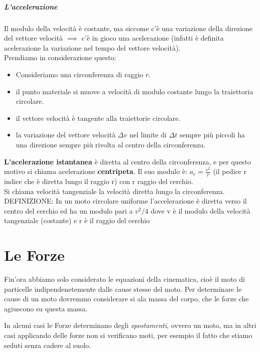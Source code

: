 \documentclass[12pt, a4paper, openany]{book}
\begin{document}
\paragraph*{L'accelerazione }Il modulo della velocità è costante, ma siccome c'è una variazione della direzione del vettore velocità $\implies$ c'è in gioco una acelerazione
(infatti è definita acelerazione la variazione nel tempo del vettore velocità).
\\Prendiamo in considerazione questo:
\begin{itemize}
    \item Consideriamo una circonferenza di raggio $r$.
    \item il punto materiale si muove a velocità di modulo costante lungo la traiettoria circolare.
    \item il vettore velocità è tangente alla traiettorie circolare.
    \item la variazione del vettore velocità $\Delta v$ nel limite di $\Delta t$ sempre più piccoli ha una direzione sempre più rivolta al centro della circonferenza.
\end{itemize}
\textbf{L'acelerazione istantanea} è diretta al centro della circonferenza, e per questo motivo si chiama acelerazione \textbf{centripeta}.
Il suo modulo è: $a_r = \frac{v^2}{r}$ (il pedice r indice che è diretta lungo il raggio r) con r raggio del cerchio.
\\Si chiama velocità tangenziale la velocità diretta lungo la circonferenza.
\\DEFINIZIONE: In un moto circolare uniforme l'accelerazione è diretta verso il centro del cerchio ed ha un modulo pari a $v^2/4$ dove v è il modulo della velocità tangenziale (costante) e r è il raggio del cerchio

\chapter{Le Forze}
Fin'ora abbiamo solo considerato le equazioni della cinematica, cioè il moto di particelle indipendenetemente dalle cause stesse del moto.
Per determinare le cause di un moto dovremmo considerare si ala massa del corpo, che le forze che agiuscono su questa massa.

In alcuni casi le Forze determinano degli \emph{spostamenti}, ovvero un moto, ma in altri casi applicando delle forze non si verificano moti, per esempio il fatto che stiamo seduti senza cadere al suolo.
\end{document}
